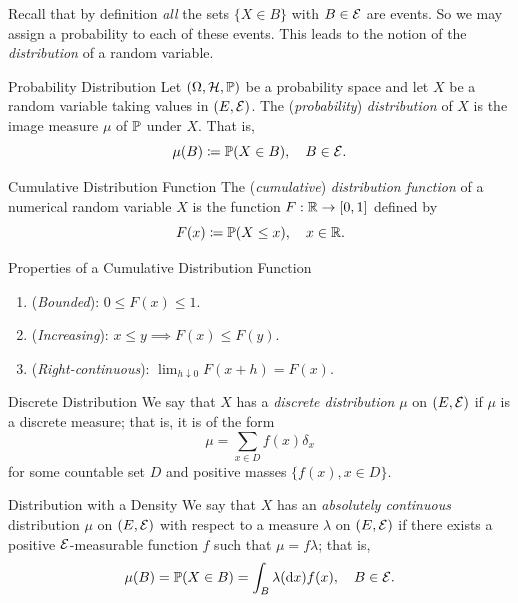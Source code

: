 Recall that by definition \textit{all} the sets \(\{X \in B\}\) with \(B \in \mathcal{E}\) are events. So we
may assign a probability to each of these events. This leads to the notion of the
\textit{distribution} of a random variable.

\begin{defn}{Probability Distribution}{}
	Let \((\Omega, \mathcal{H}, \mathbb{P})\) be a probability space and let \(X\) be a random variable taking values in \((E, \mathcal{E})\). The (\textit{probability}) \textit{distribution} of \(X\) is the image measure \(\mu\) of \(\mathbb{P}\) under \(X\). That is,
	\begin{equation}
		\mu(B) \coloneqq \mathbb{P}(X \in B), \quad B \in \mathcal{E}.
		\label{eq:ProbabilityDistributionDef}
	\end{equation}
\end{defn}

\begin{defn}{Cumulative Distribution Function}{}
	The (\textit{cumulative}) \textit{distribution function} of a numerical random variable \(X\) is the function \(F : \mathbb{R} \to [0, 1]\) defined by
	\begin{equation}
		F(x) \coloneqq \mathbb{P}(X \le x), \quad x \in \mathbb{R}.
		\label{eq:CumulativeDistributionFunctionDef}
	\end{equation}
\end{defn}

\begin{prop}{Properties of a Cumulative Distribution Function}{}
	\begin{enumerate}
		\item (\textit{Bounded}): \(0 \le F(x) \le 1\).
		\item (\textit{Increasing}): \(x \le y \implies F(x) \le F(y)\).
		\item (\textit{Right-continuous}): \(\lim_{h \downarrow 0} F(x + h) = F(x)\).
	\end{enumerate}
\end{prop}

\begin{defn}{Discrete Distribution}{}
	We say that \(X\) has a \textit{discrete distribution} \(\mu\) on \((E, \mathcal{E})\) if \(\mu\) is a discrete measure; that is, it is of the form
	\begin{equation*}
		\mu = \sum_{x \in D} f(x) \delta_x
	\end{equation*}
	for some countable set \(D\) and positive masses \(\{f(x), x \in D\}\).
\end{defn}

\begin{defn}{Distribution with a Density}{}
	We say that \(X\) has an \textit{absolutely continuous} distribution \(\mu\) on \((E, \mathcal{E})\) with respect to a measure \(\lambda\) on \((E, \mathcal{E})\) if there exists a positive \(\mathcal{E}\)-measurable function \(f\) such that \(\mu = f \lambda\); that is,
	\begin{equation*}
		\mu(B) = \mathbb{P}(X \in B) = \int_B \lambda(\mathrm{d} x) f(x), \quad B \in \mathcal{E}.
	\end{equation*}
\end{defn}

